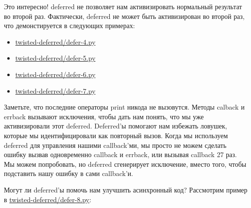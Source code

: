 Это интересно! deferred не позволяет нам 
активизировать нормальный результат во второй раз. 
Фактически, deferred не может быть активизирован во второй 
раз, что демонстируется в следующих примерах: 

\begin{itemize}
\item \href{http://github.com/jdavisp3/twisted-intro/blob/master/twisted-deferred/defer-4.py}{twisted-deferred/defer-4.py}
\item \href{http://github.com/jdavisp3/twisted-intro/blob/master/twisted-deferred/defer-5.py}{twisted-deferred/defer-5.py}
\item \href{http://github.com/jdavisp3/twisted-intro/blob/master/twisted-deferred/defer-6.py}{twisted-deferred/defer-6.py}
\item \href{http://github.com/jdavisp3/twisted-intro/blob/master/twisted-deferred/defer-7.py}{twisted-deferred/defer-7.py}
\end{itemize}


Заметьте, что последние операторы print никода не вызовутся. 
Методы calback и errback вызывают исключения, 
чтобы дать нам понять, что мы уже активизировали этот deferred. 
Deferred'ы помогают нам избежать ловушек, которые мы идентифицировали 
как повторный вызов. Когда мы используем 
deferred для управления нашими callback'ми, мы просто не можем 
сделать ошибку вызвав одновременно callback и errback, или вызывая callback 
27 раз. Мы можем попробовать, но deferred сгенерирует исключение, 
вместо того, чтобы подставить нашу ошибку в сами callback'и. 


Могут ли deferred'ы помочь нам улучшить асинхронный код? 
Рассмотрим пример в 
\href{http://github.com/jdavisp3/twisted-intro/blob/master/twisted-deferred/defer-8.py}{twisted-deferred/defer-8.py}:

